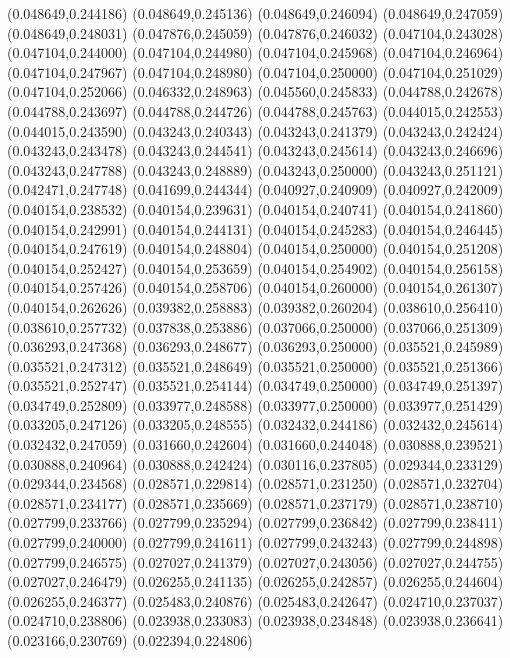 (0.048649,0.244186)
(0.048649,0.245136)
(0.048649,0.246094)
(0.048649,0.247059)
(0.048649,0.248031)
(0.047876,0.245059)
(0.047876,0.246032)
(0.047104,0.243028)
(0.047104,0.244000)
(0.047104,0.244980)
(0.047104,0.245968)
(0.047104,0.246964)
(0.047104,0.247967)
(0.047104,0.248980)
(0.047104,0.250000)
(0.047104,0.251029)
(0.047104,0.252066)
(0.046332,0.248963)
(0.045560,0.245833)
(0.044788,0.242678)
(0.044788,0.243697)
(0.044788,0.244726)
(0.044788,0.245763)
(0.044015,0.242553)
(0.044015,0.243590)
(0.043243,0.240343)
(0.043243,0.241379)
(0.043243,0.242424)
(0.043243,0.243478)
(0.043243,0.244541)
(0.043243,0.245614)
(0.043243,0.246696)
(0.043243,0.247788)
(0.043243,0.248889)
(0.043243,0.250000)
(0.043243,0.251121)
(0.042471,0.247748)
(0.041699,0.244344)
(0.040927,0.240909)
(0.040927,0.242009)
(0.040154,0.238532)
(0.040154,0.239631)
(0.040154,0.240741)
(0.040154,0.241860)
(0.040154,0.242991)
(0.040154,0.244131)
(0.040154,0.245283)
(0.040154,0.246445)
(0.040154,0.247619)
(0.040154,0.248804)
(0.040154,0.250000)
(0.040154,0.251208)
(0.040154,0.252427)
(0.040154,0.253659)
(0.040154,0.254902)
(0.040154,0.256158)
(0.040154,0.257426)
(0.040154,0.258706)
(0.040154,0.260000)
(0.040154,0.261307)
(0.040154,0.262626)
(0.039382,0.258883)
(0.039382,0.260204)
(0.038610,0.256410)
(0.038610,0.257732)
(0.037838,0.253886)
(0.037066,0.250000)
(0.037066,0.251309)
(0.036293,0.247368)
(0.036293,0.248677)
(0.036293,0.250000)
(0.035521,0.245989)
(0.035521,0.247312)
(0.035521,0.248649)
(0.035521,0.250000)
(0.035521,0.251366)
(0.035521,0.252747)
(0.035521,0.254144)
(0.034749,0.250000)
(0.034749,0.251397)
(0.034749,0.252809)
(0.033977,0.248588)
(0.033977,0.250000)
(0.033977,0.251429)
(0.033205,0.247126)
(0.033205,0.248555)
(0.032432,0.244186)
(0.032432,0.245614)
(0.032432,0.247059)
(0.031660,0.242604)
(0.031660,0.244048)
(0.030888,0.239521)
(0.030888,0.240964)
(0.030888,0.242424)
(0.030116,0.237805)
(0.029344,0.233129)
(0.029344,0.234568)
(0.028571,0.229814)
(0.028571,0.231250)
(0.028571,0.232704)
(0.028571,0.234177)
(0.028571,0.235669)
(0.028571,0.237179)
(0.028571,0.238710)
(0.027799,0.233766)
(0.027799,0.235294)
(0.027799,0.236842)
(0.027799,0.238411)
(0.027799,0.240000)
(0.027799,0.241611)
(0.027799,0.243243)
(0.027799,0.244898)
(0.027799,0.246575)
(0.027027,0.241379)
(0.027027,0.243056)
(0.027027,0.244755)
(0.027027,0.246479)
(0.026255,0.241135)
(0.026255,0.242857)
(0.026255,0.244604)
(0.026255,0.246377)
(0.025483,0.240876)
(0.025483,0.242647)
(0.024710,0.237037)
(0.024710,0.238806)
(0.023938,0.233083)
(0.023938,0.234848)
(0.023938,0.236641)
(0.023166,0.230769)
(0.022394,0.224806)
